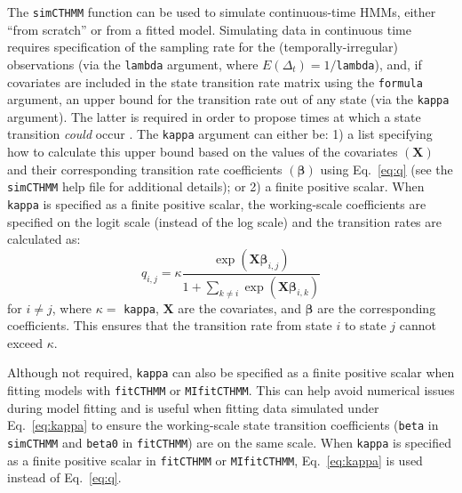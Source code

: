 \documentclass[12pt]{article}\usepackage[]{graphicx}\usepackage[]{xcolor}
\begin{document}
The \verb|simCTHMM| function can be used to simulate continuous-time HMMs, either ``from scratch'' or from a fitted model. Simulating data in continuous time requires specification of the sampling rate for the (temporally-irregular) observations (via the \verb|lambda| argument, where $E(\Delta_t)=1/$\verb|lambda|), and, if covariates are included in the state transition rate matrix using the \verb|formula| argument, an upper bound for the transition rate out of any state (via the \verb|kappa| argument). The latter is required in order to propose times at which a state transition {\it could} occur \citep[][]{BlackwellEtAl2016,McClintockLander2024}. The \verb|kappa| argument can either be: 1) a list specifying how to calculate this upper bound based on the values of the covariates $(\mathbf{X})$ and their corresponding transition rate coefficients $(\boldsymbol{\beta})$ using Eq.\ \ref{eq:q} (see the \verb|simCTHMM| help file for additional details); or 2) a finite positive scalar. When \verb|kappa| is specified as a finite positive scalar, the working-scale coefficients are specified on the logit scale (instead of the log scale) and the transition rates are calculated as:
\begin{equation}
\label{eq:kappa}
 q_{i,j} = \kappa \frac{\exp(\mathbf{X}\boldsymbol{\beta}_{i,j})}{1+\sum_{k \ne i}\exp(\mathbf{X}\boldsymbol{\beta}_{i,k})}
\end{equation}
for $i \ne j$, where $\kappa=$ \verb|kappa|, $\mathbf{X}$ are the covariates, and $\boldsymbol{\beta}$ are the corresponding coefficients. This ensures that the transition rate from state $i$ to state $j$ cannot exceed $\kappa$.

Although not required, \verb|kappa| can also be specified as a finite positive scalar when fitting models with \verb|fitCTHMM| or \verb|MIfitCTHMM|. This can help avoid numerical issues during model fitting and is useful when fitting data simulated under Eq.\ \ref{eq:kappa} to ensure the working-scale state transition coefficients (\verb|beta| in \verb|simCTHMM| and \verb|beta0| in \verb|fitCTHMM|) are on the same scale. When \verb|kappa| is specified as a finite positive scalar in \verb|fitCTHMM| or \verb|MIfitCTHMM|, Eq.\ \ref{eq:kappa} is used instead of Eq.\ \ref{eq:q}.
\end{document}
